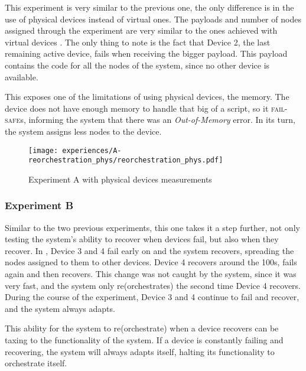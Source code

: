 This experiment is very similar to the previous one, the only difference is in the use of physical devices instead of virtual ones. The payloads and number of nodes assigned through the experiment are very similar to the ones achieved with virtual devices . The only thing to note is the fact that Device 2, the  last remaining active device, fails when receiving the bigger payload. This payload contains the code for all the nodes of the system, since no other device is available. 

This exposes one of the limitations of using physical devices, the memory. The device does not have enough memory to handle that big of a script, so it \textsc{fail-safe}s, informing the system that there was an \textit{Out-of-Memory} error. In its turn, the system assigns less nodes to the device.

\begin{figure}[h]
\centering
\texttt{[image: experiences/A-reorchestration\_phys/reorchestration\_phys.pdf]}
\caption[Experiment A with physical devices measurements]{Experiment A with physical devices measurements}\label{fig:experiment_a_phys_graph}
\end{figure}


\subsubsection{Experiment B}

Similar to the two previous experiments, this one takes it a step further, not only testing the system's ability to recover when devices fail, but also when they recover. In , Device 3 and 4 fail early on and the system recovers, spreading the nodes assigned to them to other devices. Device 4 recovers around the 100s, fails again and then recovers. This change was not caught by the system, since it was very fast, and the system only re(orchestrates) the second time Device 4 recovers. During the course of the experiment, Device 3 and 4 continue to fail and recover, and the system always adapts.

This ability for the system to re(orchestrate) when a device recovers can be taxing to the functionality of the system. If a device is constantly failing and recovering, the system will always adapts itself, halting its functionality to orchestrate itself.

